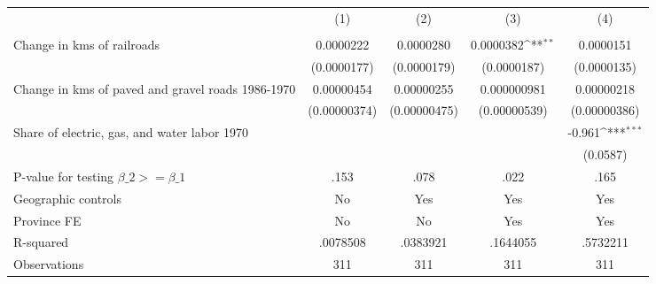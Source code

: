 {
\def\sym#1{\ifmmode^{#1}\else\(^{#1}\)\fi}
\begin{tabular}{l*{4}{c}}
\hline\hline
                &\multicolumn{1}{c}{(1)}&\multicolumn{1}{c}{(2)}&\multicolumn{1}{c}{(3)}&\multicolumn{1}{c}{(4)}\\
                &\multicolumn{1}{c}{}&\multicolumn{1}{c}{}&\multicolumn{1}{c}{}&\multicolumn{1}{c}{}\\
\hline
Change in kms of railroads&0.0000222         &0.0000280         &0.0000382\sym{**} &0.0000151         \\
                &(0.0000177)         &(0.0000179)         &(0.0000187)         &(0.0000135)         \\
[1em]
Change in kms of paved and gravel roads 1986-1970&0.00000454         &0.00000255         &0.000000981         &0.00000218         \\
                &(0.00000374)         &(0.00000475)         &(0.00000539)         &(0.00000386)         \\
[1em]
Share of electric, gas, and water labor 1970&                  &                  &                  &   -0.961\sym{***}\\
                &                  &                  &                  & (0.0587)         \\
\hline
P-value for testing $\beta\_{2} >= \beta\_{1}$&     .153         &     .078         &     .022         &     .165         \\
Geographic controls&       No         &      Yes         &      Yes         &      Yes         \\
Province FE     &       No         &       No         &      Yes         &      Yes         \\
R-squared       & .0078508         & .0383921         & .1644055         & .5732211         \\
Observations    &      311         &      311         &      311         &      311         \\
\hline\hline
\end{tabular}
}
